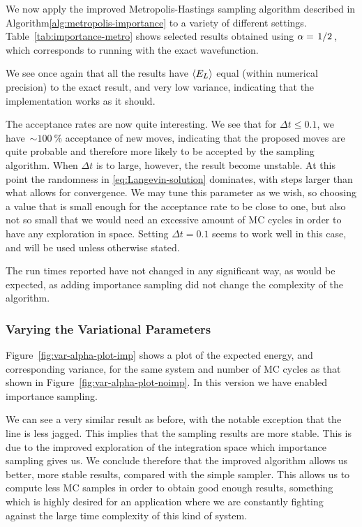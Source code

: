 \documentclass[twocolumn]{article}
\begin{document}
We now apply the improved Metropolis-Hastings sampling algorithm described in 
Algorithm\ref{alg:metropolis-importance} to a variety of different settings.
Table~\ref{tab:importance-metro} shows selected results obtained using
$\alpha=\flatfrac{1}{2}$, which corresponds to running with the exact
wavefunction. 

We see once again that all the results have $\expval{E_L}$
equal (within numerical precision) to the exact result, and very low variance,
indicating that the implementation works as it should.

The acceptance rates are now quite interesting. We see that for $\Delta t \leq
0.1$, we have~$\sim\SI{100}{\percent}$ acceptance of new moves, indicating that
the proposed moves are quite probable and therefore more likely to be accepted
by the sampling algorithm. When $\Delta t$ is to large, however, the result
become unstable. At this point the randomness in \eqref{eq:Langevin-solution}
dominates, with steps larger than what allows for convergence. We may tune this
parameter as we wish, so choosing a value that is small enough for the
acceptance rate to be close to one, but also not so small that we would need an
excessive amount of MC cycles in order to have any exploration in space. Setting
$\Delta t=0.1$ seems to work well in this case, and will be used unless
otherwise stated.

The run times reported have not changed in any significant way, as would be
expected, as adding importance sampling did not change the complexity of the algorithm.


\subsubsection{Varying the Variational Parameters}
Figure~\ref{fig:var-alpha-plot-imp} shows a plot of the expected energy, and
corresponding variance, for the same system and number of MC cycles as that
shown in Figure~\ref{fig:var-alpha-plot-noimp}. In this version we have enabled
importance sampling.

We can see a very similar result as before, with the notable exception that the
line is less jagged. This implies that the sampling results are more stable.
This is due to the improved exploration of the integration space which
importance sampling gives us. We conclude therefore that the improved algorithm
allows us better, more stable results, compared with the simple sampler. This
allows us to compute less MC samples in order to obtain good enough results,
something which is highly desired for an application where we are constantly
fighting against the large time complexity of this kind of system.
\end{document}
